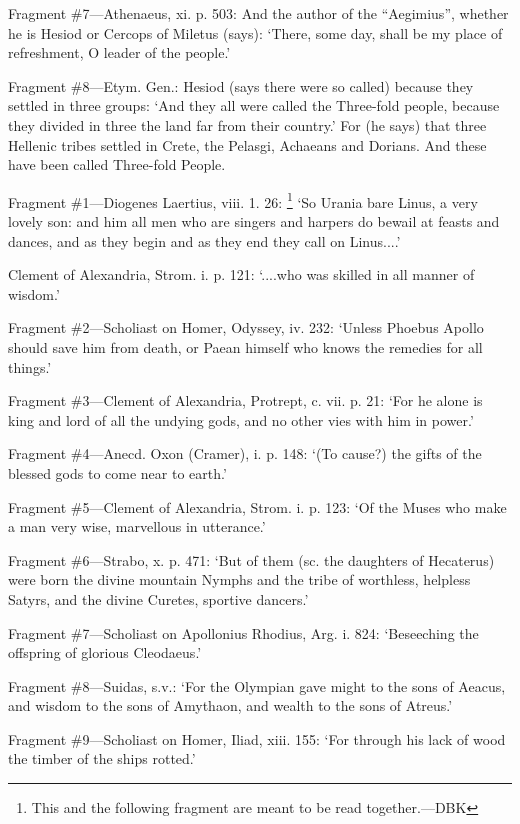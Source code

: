 Fragment \#7—Athenaeus, xi. p. 503: And the author of the
“Aegimius”, whether he is Hesiod or Cercops of Miletus (says):
‘There, some day, shall be my place of refreshment, O leader of the
people.’

Fragment \#8—Etym. Gen.: Hesiod (says there were so called) because they
settled in three groups: ‘And they all were called the Three-fold people,
because they divided in three the land far from their country.’ For (he
says) that three Hellenic tribes settled in Crete, the Pelasgi, Achaeans and
Dorians. And these have been called Three-fold People.


Fragment \#1—Diogenes Laertius, viii. 1. 26: \footnote{This and the following
fragment are meant to be read together.—DBK} ‘So
Urania bare Linus, a very lovely son: and him all men who are singers and
harpers do bewail at feasts and dances, and as they begin and as they end they
call on Linus....’

Clement of Alexandria, Strom. i. p. 121: ‘....who was skilled in all
manner of wisdom.’

Fragment \#2—Scholiast on Homer, Odyssey, iv. 232: ‘Unless Phoebus
Apollo should save him from death, or Paean himself who knows the remedies for
all things.’

Fragment \#3—Clement of Alexandria, Protrept, c. vii. p. 21: ‘For he
alone is king and lord of all the undying gods, and no other vies with him in
power.’

Fragment \#4—Anecd. Oxon (Cramer), i. p. 148: ‘(To cause?) the gifts
of the blessed gods to come near to earth.’

Fragment \#5—Clement of Alexandria, Strom. i. p. 123: ‘Of the Muses
who make a man very wise, marvellous in utterance.’

Fragment \#6—Strabo, x. p. 471: ‘But of them (sc. the daughters of
Hecaterus) were born the divine mountain Nymphs and the tribe of worthless,
helpless Satyrs, and the divine Curetes, sportive dancers.’

Fragment \#7—Scholiast on Apollonius Rhodius, Arg. i. 824:
‘Beseeching the offspring of glorious Cleodaeus.’

Fragment \#8—Suidas, s.v.: ‘For the Olympian gave might to the sons
of Aeacus, and wisdom to the sons of Amythaon, and wealth to the sons of
Atreus.’

Fragment \#9—Scholiast on Homer, Iliad, xiii. 155: ‘For through his
lack of wood the timber of the ships rotted.’

